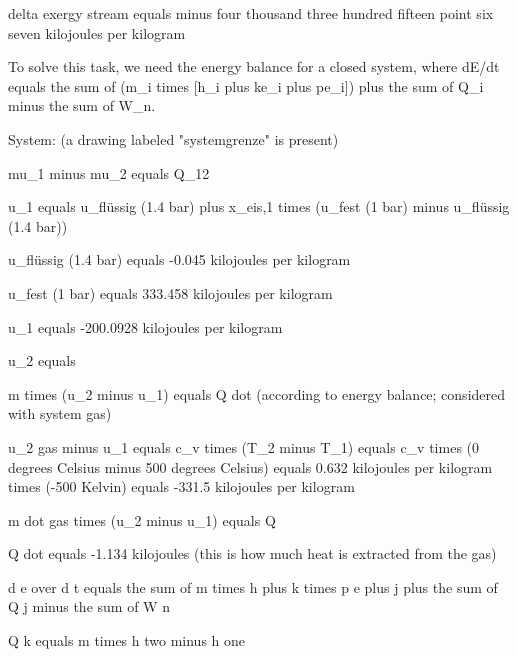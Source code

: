 delta exergy stream equals minus four thousand three hundred fifteen point six seven kilojoules per kilogram

To solve this task, we need the energy balance for a closed system, where dE/dt equals the sum of (m_i times [h_i plus ke_i plus pe_i]) plus the sum of Q_i minus the sum of W_n.

System: (a drawing labeled "systemgrenze" is present)

mu_1 minus mu_2 equals Q_12

u_1 equals u_flüssig (1.4 bar) plus x_eis,1 times (u_fest (1 bar) minus u_flüssig (1.4 bar))

u_flüssig (1.4 bar) equals -0.045 kilojoules per kilogram

u_fest (1 bar) equals 333.458 kilojoules per kilogram

u_1 equals -200.0928 kilojoules per kilogram

u_2 equals

m times (u_2 minus u_1) equals Q dot (according to energy balance; considered with system gas)

u_2 gas minus u_1 equals c_v times (T_2 minus T_1) equals c_v times (0 degrees Celsius minus 500 degrees Celsius) equals 0.632 kilojoules per kilogram times (-500 Kelvin) equals -331.5 kilojoules per kilogram

m dot gas times (u_2 minus u_1) equals Q

Q dot equals -1.134 kilojoules (this is how much heat is extracted from the gas)

d e over d t equals the sum of m times h plus k times p e plus j plus the sum of Q j minus the sum of W n

Q k equals m times h two minus h one
